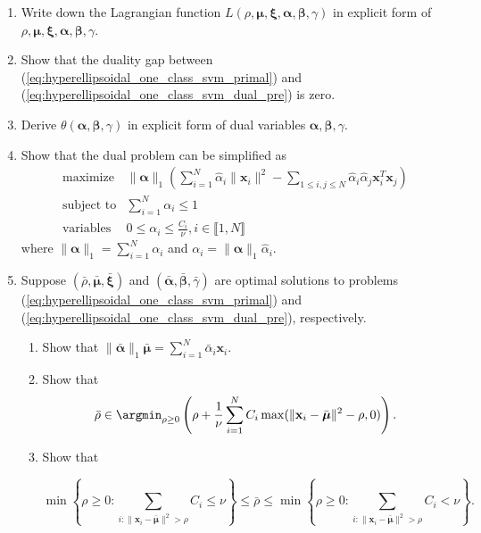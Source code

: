 \documentclass{article}
\def\vecx{{\mathbf x}}
\def\vecalpha{{\mathbf \alpha}}
\def\vecbeta{{\mathbf \beta}}
\def\vecmu{{\boldsymbol \mu}}
\def\vecxi{{\boldsymbol \xi}}
\begin{document}
%
\begin{enumerate}
\item  Write down the Lagrangian function $L(\rho,\vecmu,\vecxi,\vecalpha,\vecbeta,\gamma)$ in explicit form of $\rho,\vecmu,\vecxi,\vecalpha,\vecbeta,\gamma$.
\item Show that the duality gap between (\ref{eq:hyperellipsoidal_one_class_svm_primal}) and (\ref{eq:hyperellipsoidal_one_class_svm_dual_pre}) is zero.
\item Derive $\theta(\vecalpha,\vecbeta,\gamma)$ in explicit form of dual variables $\vecalpha,\vecbeta,\gamma$.
\item Show that the dual problem can be simplified as
\begin{equation}\label{eq:hyperellipsoidal_one_class_svm_dual}
\begin{array}{ll}
\mbox{maximize} 	& \|\vecalpha\|_1 \left(\sum_{i=1}^N {\hat \alpha}_i \|\vecx_i\|^2 -\sum_{1\leq i,j \leq N} {\hat \alpha}_i {\hat \alpha}_j \vecx_i^T \vecx_j \right)\\
\mbox{subject to} 	& \sum_{i=1}^N \alpha_i \leq 1\\
\mbox{variables} 	& 0 \leq \alpha_i \leq \frac{C_i}{\nu}, i \in \llbracket 1,N\rrbracket
\end{array}
\end{equation}
%
where $\|\vecalpha\|_1 = \sum_{i=1}^N \alpha_i$ and $\alpha_i = \|\vecalpha\|_1 {\hat \alpha}_i$.
%
\item Suppose $({\bar \rho}, {\bar \vecmu}, {\bar \vecxi})$ and $({\bar \vecalpha},{\bar \vecbeta},{\bar \gamma})$ are optimal solutions to problems (\ref{eq:hyperellipsoidal_one_class_svm_primal}) and (\ref{eq:hyperellipsoidal_one_class_svm_dual_pre}), respectively.
\begin{enumerate}
\item Show that $\|{\bar \vecalpha}\|_1 {\bar \vecmu} = \sum_{i=1}^N {\bar \alpha}_i\vecx_i$.
\item Show that
\begin{equation*}
{\bar \rho} \in \argmin_{\rho \geq 0}\left(\rho + \frac{1}{\nu}\sum_{i=1}^N C_i\max(\|\vecx_i-{\bar \vecmu}\|^2 - \rho,0)\right).
\end{equation*}
%
\item Show that
\begin{footnotesize}
\begin{equation}\label{eq:one_class_svm_optimal_rho}
\min\left\{\rho \geq 0: \sum_{i:\|\vecx_i-{\bar \vecmu}\|^2 > \rho} C_i \leq \nu \right\}
\leq {\bar \rho}
\leq \min\left\{\rho \geq 0: \sum_{i:\|\vecx_i-{\bar \vecmu}\|^2 > \rho} C_i < \nu \right\}.

\end{equation}
\end{footnotesize}
\end{enumerate}
\end{enumerate}
\end{document}
